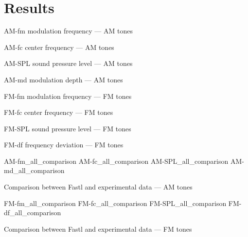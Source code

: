 \documentclass[../main.tex]{subfiles}
\begin{document}
\section{Results}

\begin{results}

\myfigurefastlexpstds%
  {AM-fm}
  {modulation frequency --- AM tones}

\myfigurefastlexpstds%
  {AM-fc}
  {center frequency --- AM tones}

\myfigurefastlexpstds%
  {AM-SPL}
  {sound pressure level --- AM tones}

\myfigurefastlexpstds%
  {AM-md}
  {modulation depth --- AM tones}

\myfigurefastlexpstds%
  {FM-fm}
  {modulation frequency --- FM tones}

\myfigurefastlexpstds%
  {FM-fc}
  {center frequency --- FM tones}

\myfigurefastlexpstds%
  {FM-SPL}
  {sound pressure level --- FM tones}

\myfigurefastlexpstds%
  {FM-df}
  {frequency deviation --- FM tones}

\myfigurequad%
  {AM-fm_all_comparison}
  {AM-fc_all_comparison}
  {AM-SPL_all_comparison}
  {AM-md_all_comparison}
  {
    \caption{Comparison between Fastl and experimental data --- AM tones}
    \label{fig:am_comparison}
  }

\myfigurequad%
  {FM-fm_all_comparison}
  {FM-fc_all_comparison}
  {FM-SPL_all_comparison}
  {FM-df_all_comparison}
  {
    \caption{Comparison between Fastl and experimental data --- FM tones}
    \label{fig:fm_comparison}
  }

\end{results}
\end{document}
